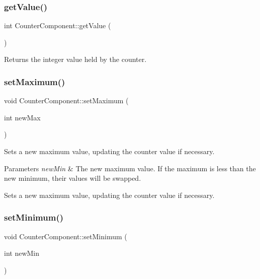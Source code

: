 \subsubsection{\texorpdfstring{get\+Value()}{getValue()}}
{\footnotesize\ttfamily int Counter\+Component\+::get\+Value (\begin{DoxyParamCaption}{ }\end{DoxyParamCaption})}

\begin{DoxyReturn}{Returns}
the integer value held by the counter. 
\end{DoxyReturn}
\mbox{\label{classCounterComponent_aa2711f533b3342f84996e8a9cf73890c}} 
\subsubsection{\texorpdfstring{set\+Maximum()}{setMaximum()}}
{\footnotesize\ttfamily void Counter\+Component\+::set\+Maximum (\begin{DoxyParamCaption}\item[{int}]{new\+Max }\end{DoxyParamCaption})}

Sets a new maximum value, updating the counter value if necessary.


\begin{DoxyParams}{Parameters}
{\em new\+Min} & The new maximum value. If the maximum is less than the new minimum, their values will be swapped.\\
\hline
\end{DoxyParams}
Sets a new maximum value, updating the counter value if necessary. \mbox{\label{classCounterComponent_a7a1db869bf4b07038d0c9cb2a01cf0dd}} 
\subsubsection{\texorpdfstring{set\+Minimum()}{setMinimum()}}
{\footnotesize\ttfamily void Counter\+Component\+::set\+Minimum (\begin{DoxyParamCaption}\item[{int}]{new\+Min }\end{DoxyParamCaption})}

